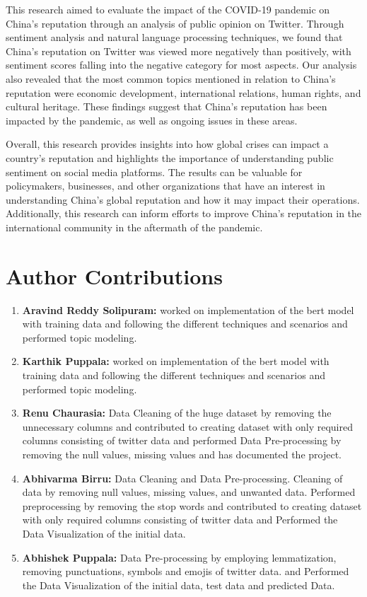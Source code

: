 \documentclass[conference]{IEEEtran}
\begin{document}
 This research aimed to evaluate the impact of the COVID-19 pandemic on China's reputation through an analysis of public opinion on Twitter. Through sentiment analysis and natural language processing techniques, we found that China's reputation on Twitter was viewed more negatively than positively, with sentiment scores falling into the negative category for most aspects. Our analysis also revealed that the most common topics mentioned in relation to China's reputation were economic development, international relations, human rights, and cultural heritage. These findings suggest that China's reputation has been impacted by the pandemic, as well as ongoing issues in these areas.

Overall, this research provides insights into how global crises can impact a country's reputation and highlights the importance of understanding public sentiment on social media platforms. The results can be valuable for policymakers, businesses, and other organizations that have an interest in understanding China's global reputation and how it may impact their operations. Additionally, this research can inform efforts to improve China's reputation in the international community in the aftermath of the pandemic.

\section{Author Contributions}

\begin{enumerate}

\item \textbf{Aravind Reddy Solipuram:} worked on implementation of the bert model with training data and following the different techniques and scenarios and performed topic modeling.
\item \textbf{Karthik Puppala:} worked on implementation of the bert model with training data and following the different techniques and scenarios and performed topic modeling.
\item \textbf{Renu Chaurasia:} Data Cleaning of the huge dataset by removing the unnecessary columns and contributed to creating dataset with only required columns consisting of twitter data and performed Data Pre-processing by removing the null values, missing values and has documented the project.
\item \textbf{Abhivarma Birru:} Data Cleaning and  Data Pre-processing. Cleaning of data by removing null values, missing values, and unwanted data. Performed preprocessing by removing the stop words and contributed to creating dataset with only required columns consisting of twitter data and Performed the Data Visualization of the initial data.
\item \textbf{Abhishek Puppala:} Data Pre-processing by employing lemmatization, removing punctuations, symbols and emojis of twitter data. and Performed the Data Visualization of the initial data, test data and predicted Data.

\end{enumerate}
\end{document}
